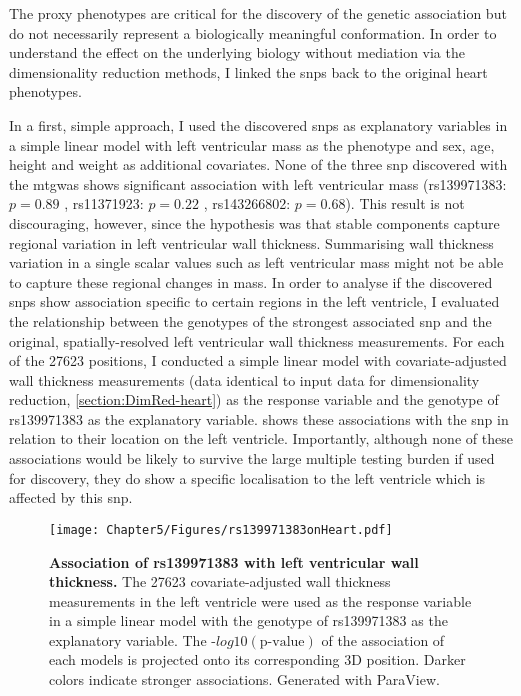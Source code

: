 %
The proxy phenotypes are critical for the discovery of the genetic association but do not necessarily represent a biologically meaningful conformation. In order to understand the effect on the underlying biology without mediation via the dimensionality reduction methods, I linked the \glspl{snp} back to the original heart phenotypes.

In a first, simple approach, I used the discovered \glspl{snp} as explanatory variables in a simple linear model with left ventricular mass as the phenotype and sex, age, height and weight as additional covariates. None of the three \gls{snp} discovered with the \gls{mtgwas} shows significant association with left ventricular mass (rs139971383: \(p=0.89\) , rs11371923: \(p=0.22\) , rs143266802: \(p=0.68\)). This result is not discouraging, however, since the hypothesis was that stable components capture regional variation in left ventricular wall thickness. Summarising wall thickness variation in a single scalar values such as left ventricular mass might not be able to capture these regional changes in mass. In order to analyse if the discovered \glspl{snp} show association specific to certain regions in the left ventricle, I evaluated the relationship between the genotypes of the strongest associated \gls{snp} and the original, spatially-resolved left ventricular wall thickness measurements. 
For each of the \num{27623} positions, I conducted a simple linear model with covariate-adjusted wall thickness measurements (data identical to input data for dimensionality reduction, \cref{section:DimRed-heart}) as the response variable and the genotype of rs139971383 as the explanatory variable.  shows these associations with the \gls{snp} in relation to their location on the left ventricle. Importantly, although none of these associations would be likely to survive the large multiple testing burden if used for discovery, they do show a specific localisation to the left ventricle which is affected by this \gls{snp}.

\begin{figure}[hbtp]
	\centering
	\texttt{[image: Chapter5/Figures/rs139971383onHeart.pdf]}
	\caption[\textbf{Association of  rs139971383 with left ventricular wall thickness. }]{\textbf{Association of rs139971383 with left ventricular wall thickness. }The \num{27623} covariate-adjusted wall thickness measurements in the left ventricle were used as the response variable in a simple linear model with the genotype of rs139971383 as the explanatory variable. The -\(log10(\text{p-value})\) of the association of each models is projected onto its corresponding 3D position. Darker colors indicate stronger associations. Generated with ParaView. } 
	 	\label{fig:wall-heart}
\end{figure}


